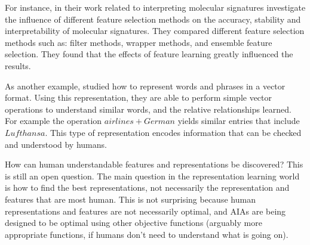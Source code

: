    For instance, in their work related to interpreting molecular signatures \citet{Haury2011-zi} investigate the influence of different feature selection methods on the accuracy, stability and interpretability of molecular signatures. They compared different feature selection methods such as: filter methods, wrapper methods, and ensemble feature selection. They found that the effects of feature learning greatly influenced the results. 

    As another example, \citet{Mikolov2013-lt} studied how to represent words and phrases in a vector format. Using this representation, they are able to perform simple vector operations to understand similar words, and the relative relationships learned. For example the operation $airlines+German$ yields similar entries that include $Lufthansa$. This type of representation encodes information that can be checked and understood by humans. 
    
    How can human understandable features and representations be discovered? This is still an open question. The main question in the representation learning world is how to find the best representations, not necessarily the representation and features that are most human. This is not surprising because human representations and features are not necessarily optimal, and AIAs are being designed to be optimal using other objective functions (arguably more appropriate functions, if humans don't need to understand what is going on).
%
%
%

